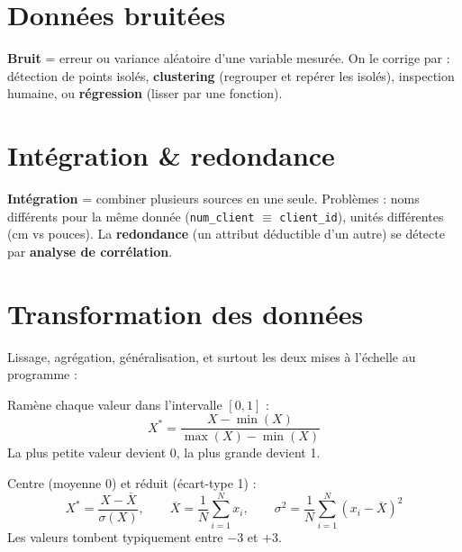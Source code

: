 \section{Données bruitées}
\textbf{Bruit} = erreur ou variance aléatoire d'une variable mesurée. On le corrige par :
détection de points isolés, \textbf{clustering} (regrouper et repérer les isolés),
inspection humaine, ou \textbf{régression} (lisser par une fonction).

\section{Intégration \& redondance}
\textbf{Intégration} = combiner plusieurs sources en une seule. Problèmes : noms différents
pour la même donnée (\texttt{num\_client} $\equiv$ \texttt{client\_id}), unités différentes
(cm vs pouces). La \textbf{redondance} (un attribut déductible d'un autre) se détecte par
\textbf{analyse de corrélation}.

\section{Transformation des données}
Lissage, agrégation, généralisation, et surtout les deux mises à l'échelle au programme :

\begin{Definition}
Ramène chaque valeur dans l'intervalle $[0,1]$ :
\[ X^{*} = \frac{X - \min(X)}{\max(X) - \min(X)} \]
La plus petite valeur devient 0, la plus grande devient 1.
\end{Definition}

\begin{Definition}
Centre (moyenne 0) et réduit (écart-type 1) :
\[ X^{*} = \frac{X - \overline{X}}{\sigma(X)}, \qquad
   \overline{X}=\frac{1}{N}\sum_{i=1}^{N}x_i, \qquad
   \sigma^2=\frac{1}{N}\sum_{i=1}^{N}(x_i-\overline{X})^2 \]
Les valeurs tombent typiquement entre $-3$ et $+3$.
\end{Definition}

